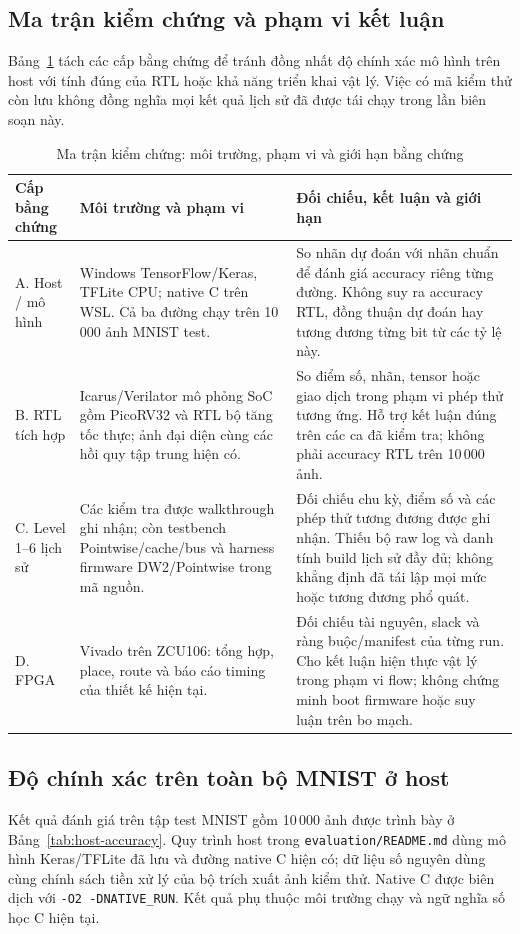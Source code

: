 \subsection{Ma trận kiểm chứng và phạm vi kết luận}
Bảng~\ref{tab:verification-matrix} tách các cấp bằng chứng để tránh đồng nhất độ chính xác mô hình trên host với tính đúng của RTL hoặc khả năng triển khai vật lý. Việc có mã kiểm thử còn lưu không đồng nghĩa mọi kết quả lịch sử đã được tái chạy trong lần biên soạn này.

\begin{table}[!ht]
\renewcommand{\arraystretch}{1.12}
\centering
\caption{Ma trận kiểm chứng: môi trường, phạm vi và giới hạn bằng chứng}
\label{tab:verification-matrix}
\small
\begin{tabularx}{\textwidth}{>{\raggedright\arraybackslash}p{} >{\raggedright\arraybackslash}X >{\raggedright\arraybackslash}X}
\hline
Cấp bằng chứng & Môi trường và phạm vi & Đối chiếu, kết luận và giới hạn \\
\hline
A. Host / mô hình & Windows TensorFlow/Keras, TFLite CPU; native C trên WSL. Cả ba đường chạy trên 10\,000 ảnh MNIST test. & So nhãn dự đoán với nhãn chuẩn để đánh giá accuracy riêng từng đường. Không suy ra accuracy RTL, đồng thuận dự đoán hay tương đương từng bit từ các tỷ lệ này. \\
\hline
B. RTL tích hợp & Icarus/Verilator mô phỏng SoC gồm PicoRV32 và RTL bộ tăng tốc thực; ảnh đại diện cùng các hồi quy tập trung hiện có. & So điểm số, nhãn, tensor hoặc giao dịch trong phạm vi phép thử tương ứng. Hỗ trợ kết luận đúng trên các ca đã kiểm tra; không phải accuracy RTL trên 10\,000 ảnh. \\
\hline
C. Level 1--6 lịch sử & Các kiểm tra được walkthrough ghi nhận; còn testbench Pointwise/cache/bus và harness firmware DW2/Pointwise trong mã nguồn. & Đối chiếu chu kỳ, điểm số và các phép thử tương đương được ghi nhận. Thiếu bộ raw log và danh tính build lịch sử đầy đủ; không khẳng định đã tái lập mọi mức hoặc tương đương phổ quát. \\
\hline
D. FPGA & Vivado trên ZCU106: tổng hợp, place, route và báo cáo timing của thiết kế hiện tại. & Đối chiếu tài nguyên, slack và ràng buộc/manifest của từng run. Cho kết luận hiện thực vật lý trong phạm vi flow; không chứng minh boot firmware hoặc suy luận trên bo mạch. \\
\hline
\end{tabularx}
\end{table}

\subsection{Độ chính xác trên toàn bộ MNIST ở host}
Kết quả đánh giá trên tập test MNIST gồm 10\,000 ảnh được trình bày ở Bảng~\ref{tab:host-accuracy}. Quy trình host trong \texttt{evaluation/README.md} dùng mô hình Keras/TFLite đã lưu và đường native C hiện có; dữ liệu số nguyên dùng cùng chính sách tiền xử lý của bộ trích xuất ảnh kiểm thử. Native C được biên dịch với \texttt{-O2 -DNATIVE\_RUN}. Kết quả phụ thuộc môi trường chạy và ngữ nghĩa số học C hiện tại.


